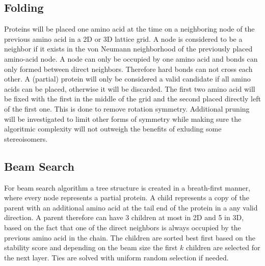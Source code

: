 \documentclass{article}
\begin{document}
\subsection{Folding}
Proteins will be placed one amino acid at the time on a neighboring node of the previous amino acid in a 2D or 3D lattice grid. A node is considered to be a neighbor if it exists in the von Neumann neighborhood of the previously placed amino-acid node. A node can only be occupied by one amino acid and bonds can only formed between direct neighbors. Therefore hard bonds can not cross each other. A (partial) protein will only be considered a valid candidate if all amino acids can be placed, otherwise it will be discarded. The first two amino acid will be fixed with the first in the middle of the grid and the second placed directly left of the first one. This is done to remove rotation symmetry. Additional pruning will be investigated to limit other forms of symmetry while making sure the algoritmic complexity will not outweigh the benefits of exluding some stereoisomers.

\subsection{Beam Search}
For beam search algorithm a tree structure is created in a breath-first manner, where every node represents a partial protein. A child represents a copy of the parent with an additional amino acid at the tail end of the protein in a any valid direction. A parent therefore can have 3 children at most in 2D and 5 in 3D, based on the fact that one of the direct neighbors is always occupied by the previous amino acid in the chain. The children are sorted best first based on the stability score and depending on the beam size the first $k$ children are selected for the next layer. Ties are solved with uniform random selection if needed. 
\end{document}
